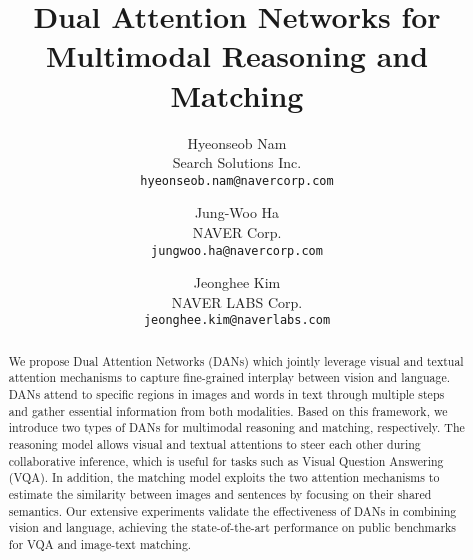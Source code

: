 \documentclass[10pt,twocolumn,letterpaper]{article}
\begin{document}
\title{Dual Attention Networks for Multimodal Reasoning and Matching}

\author{Hyeonseob Nam\\
Search Solutions Inc.\\
{\tt\small hyeonseob.nam@navercorp.com}
\and
Jung-Woo Ha\\
NAVER Corp.\\
{\tt\small jungwoo.ha@navercorp.com}
\and
Jeonghee Kim\\
NAVER LABS Corp.\\
{\tt\small jeonghee.kim@naverlabs.com}
}




\iffalse
\author{Hyeonseob Nam\\
Institution1\\
Institution1 address\\
{\tt\small firstauthor@i1.org}
\and
Second Author\\
Institution2\\
First line of institution2 address\\
{\tt\small secondauthor@i2.org}
}
\fi

\maketitle


\begin{abstract}
We propose Dual Attention Networks (DANs) which jointly leverage visual and textual attention mechanisms to capture fine-grained interplay between vision and language.
DANs attend to specific regions in images and words in text through multiple steps and gather essential information from both modalities.
Based on this framework, we introduce two types of DANs for multimodal reasoning and matching, respectively.
The reasoning model allows visual and textual attentions to steer each other during collaborative inference, which is useful for tasks such as Visual Question Answering (VQA).
In addition, the matching model exploits the two attention mechanisms to estimate the similarity between images and sentences by focusing on their shared semantics.
Our extensive experiments validate the effectiveness of DANs in combining vision and language, achieving the state-of-the-art performance on public benchmarks for VQA and image-text matching.

\end{abstract}
\end{document}
